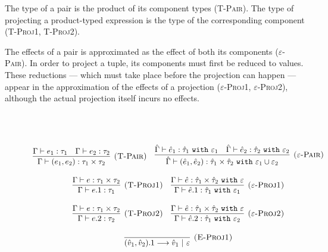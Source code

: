 The type of a pair is the product of its component types (\textsc{T-Pair}). The type of projecting a product-typed expression is the type of the corresponding component (\textsc{T-Proj1}, \textsc{T-Proj2}).

The effects of a pair is approximated as the effect of both its components (\textsc{$\varepsilon$-Pair}). In order to project a tuple, its components must first be reduced to values. These reductions --- which must take place before the projection can happen --- appear in the approximation of the effects of a projection (\textsc{$\varepsilon$-Proj1}, \textsc{$\varepsilon$-Proj2}), although the actual projection itself incurs no effects. 


\begin{figure}[h]

 \\
 \\

\[
\begin{array}{c}

\infer[\textsc{(T-Pair)}]
	{\Gamma \vdash (e_1, e_2): \tau_1 \times \tau_2}
	{\Gamma \vdash e_1: \tau_1 & \Gamma \vdash e_2: \tau_2}
	~~~
\infer[\textsc{($\varepsilon$-Pair)}]
	{\hat \Gamma \vdash (\hat e_1, \hat e_2): \hat \tau_1 \times \hat \tau_2~\kw{with} \varepsilon_1 \cup \varepsilon_2}
	{\hat \Gamma \vdash \hat e_1: \hat \tau_1~\kw{with} \varepsilon_1 & \hat \Gamma \vdash \hat e_2: \hat \tau_2~\kw{with} \varepsilon_2 } \\[3ex]

\infer[\textsc{(T-Proj1)}]
	{\Gamma \vdash e.1 : \tau_1}
	{\Gamma \vdash e: \tau_1 \times \tau_2}
~~~

\infer[\textsc{($\varepsilon$-Proj1)}]
	{\Gamma \vdash \hat e.1: \hat \tau_1~\kw{with} \varepsilon_1}
	{\Gamma \vdash \hat e: \hat \tau_1 \times \hat \tau_2 ~\kw{with} \varepsilon}\\[3ex]

\infer[\textsc{(T-Proj2)}]
	{\Gamma \vdash e.2 : \tau_2}
	{\Gamma \vdash e: \tau_1 \times \tau_2}
~~~

\infer[\textsc{($\varepsilon$-Proj2)}]
	{\Gamma \vdash \hat e.2: \hat \tau_1~\kw{with} \varepsilon_2}
	{\Gamma \vdash \hat e: \hat \tau_1 \times \hat \tau_2~\kw{with} \varepsilon} \\[3ex]

	\infer[\textsc{(E-Proj1)}]
	{(\hat v_1, \hat v_2).1 \longrightarrow \hat v_1~|~\varepsilon}
	{}
	

\end{array}\]
\end{figure}
